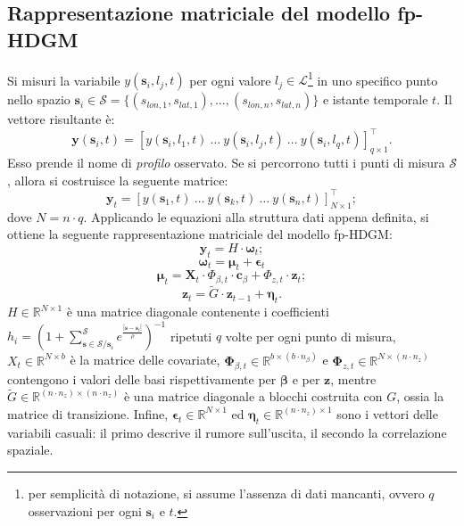 \subsection[Rappresentazione matriciale del modello fp-HDGM]{Rappresentazione matriciale del modello fp-HDGM}
Si misuri la variabile $y(\mathbf{s}_i, l_j, t)$ per ogni valore $l_j\in \mathcal{L}$\footnote{per semplicità di notazione, si assume l'assenza di dati mancanti, ovvero $q$ osservazioni per ogni $\mathbf{s}_i$ e $t$.} in uno specifico punto nello spazio $\mathbf{s}_i\in\mathcal{S} = \{(s_{lon,1}, s_{lat,1}),\dots,(s_{lon,n}, s_{lat,n})\}$ e istante temporale $t$. Il vettore risultante è:
\[
\mathbf{y}(\mathbf{s}_i, t) = \left[ y(\mathbf{s}_i, l_1, t) \ \dots \ y(\mathbf{s}_i, l_j, t) \ \dots \ y(\mathbf{s}_i, l_q, t) \right]^\top_{q\times 1}.
\]
Esso prende il nome di \textit{profilo} osservato. Se si percorrono tutti i punti di misura $\mathcal{S}$, allora si costruisce la seguente matrice:
\[
\mathbf{y}_t = \left[ {y}(\mathbf{s}_1, t) \ \dots \ {y}(\mathbf{s}_k, t) \ \dots \ {y}(\mathbf{s}_n, t) \right]^\top_{N\times 1};
\]
dove $N=n\cdot q$. Applicando le equazioni alla struttura dati appena definita, si ottiene la seguente rappresentazione matriciale del modello fp-HDGM:
\begin{equation}
	\mathbf{y}_t = H\cdot\boldsymbol{\omega}_t;
	\label{eq_matriciale_y_fp_HDGM}
\end{equation}
\begin{equation}
	\boldsymbol{\omega}_t = \boldsymbol{\mu}_t + \boldsymbol{\epsilon}_t
\end{equation}
\begin{equation}
	\boldsymbol{\mu}_t = \mathbf{X}_t\cdot\Phi_{\beta, t}\cdot\mathbf{c}_\beta + \Phi_{z, t}\cdot\mathbf{z}_t;
\end{equation}
\begin{equation}
	\mathbf{z}_t = \tilde{G}\cdot\mathbf{z}_{t-1} + \boldsymbol{\eta}_t.
	\label{eq_matriciale_z_fp_HDGM}
\end{equation}
$H\in\mathbb{R}^{N\times 1}$ è una matrice diagonale contenente i coefficienti $h_i = \left( 1 + \sum_{\mathbf{s}\in\mathcal{S}/\mathbf{s}_i}^{\mathcal{S}} e^{\frac{|\mathbf{s} - \mathbf{s}_i|}{\rho}}\right)^{-1}$ ripetuti $q$ volte per ogni punto di misura, $X_t\in\mathbb{R}^{N\times b}$ è la matrice delle covariate, $\boldsymbol{\Phi}_{\beta, t}\in\mathbb{R}^{b\times (b\cdot n_\beta)}$ e $\boldsymbol{\Phi}_{z, t}\in\mathbb{R}^{N\times(n\cdot n_z)}$ contengono i valori delle basi rispettivamente per $\boldsymbol{\beta}$ e per $\mathbf{z}$, mentre $\tilde{G}\in\mathbb{R}^{(n\cdot n_z)\times (n\cdot n_z)}$ è una matrice diagonale a blocchi costruita con $G$, ossia la matrice di transizione. Infine, $\boldsymbol{\epsilon}_t\in\mathbb{R}^{N\times 1}$ ed $\boldsymbol{\eta}_t\in\mathbb{R}^{(n\cdot n_z)\times 1}$ sono i vettori delle variabili casuali: il primo descrive il rumore sull'uscita, il secondo la correlazione spaziale.

